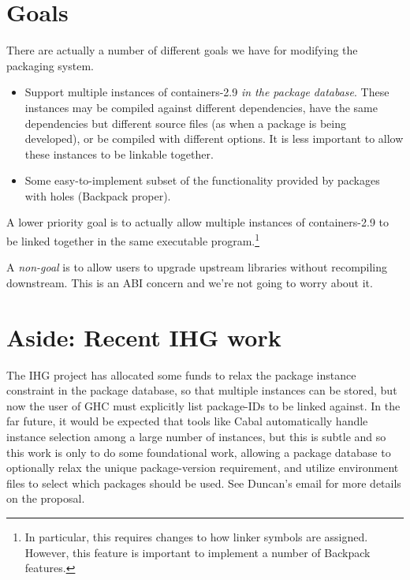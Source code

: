 \documentclass{article}
\begin{document}
\section{Goals}

There are actually a number of different goals we have for modifying the
packaging system.

\begin{itemize}
    \item Support multiple instances of containers-2.9 \emph{in the
        package database}.  These instances may be compiled against
        different dependencies, have the same dependencies but different
        source files (as when a package is being developed), or be
        compiled with different options.  It is less important to allow
        these instances to be linkable together.

    \item Some easy-to-implement subset of the functionality provided by
        packages with holes (Backpack proper).
\end{itemize}

A lower priority goal is to actually allow multiple instances of
containers-2.9 to be linked together in the same executable
program.\footnote{In particular, this requires changes to how linker symbols
are assigned. However, this feature is important to implement a number
of Backpack features.}

A \emph{non-goal} is to allow users to upgrade upstream libraries
without recompiling downstream. This is an ABI concern and we're not
going to worry about it.

\section{Aside: Recent IHG work}

The IHG project has allocated some funds to relax the package instance
constraint in the package database, so that multiple instances can be
stored, but now the user of GHC must explicitly list package-IDs to be
linked against.  In the far future, it would be expected that tools like
Cabal automatically handle instance selection among a large number of
instances, but this is subtle and so this work is only to do some
foundational work, allowing a package database to optionally relax the
unique package-version requirement, and utilize environment files to
select which packages should be used.  See Duncan's email for more
details on the proposal.
\end{document}
